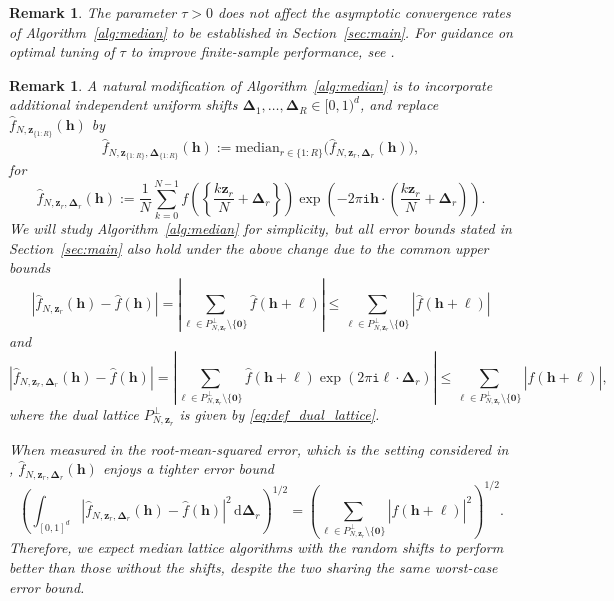 \documentclass[a4paper,11pt]{article}
\newtheorem{remark}[theorem]{Remark}
\newcommand{\rd}{\, \mathrm{d}}
\newcommand{\bszero}{\boldsymbol{0}}
\newcommand{\bsh}{\boldsymbol{h}}
\newcommand{\bsl}{\boldsymbol{\ell}}
\newcommand{\bsz}{\boldsymbol{z}}
\newcommand{\bsDelta}{\boldsymbol{\Delta}}
\newcommand{\icomp}{\mathtt{i}}
\newcommand{\abs}[1]{\left\vert#1\right\vert}
\begin{document}
\begin{remark}
    The parameter $\tau>0$ does not affect the asymptotic convergence rates of Algorithm~\ref{alg:median} to be established in Section~\ref{sec:main}. For guidance on optimal tuning of $\tau$ to improve finite-sample performance, see \cite[Remark 16]{PKG25}.
\end{remark}

\begin{remark}
A natural modification of Algorithm~\ref{alg:median} is to incorporate additional independent uniform shifts $\bsDelta_1,\dots,\bsDelta_R \in [0,1)^d$, and replace $\widehat{f}_{N,\bsz_{\{1{:}R\}}}(\bsh)$ by 
       \[ 
            \widehat{f}_{N,\bsz_{\{1{:}R\}},\bsDelta_{\{1{:}R\}}}(\bsh):=\mathrm{median}_{r\in\{1{:}R\}} \Big(\widehat{f}_{N,\bsz_r,\bsDelta_r}(\bsh)\Big),
       \]
       for 
                   \[ 
            \widehat{f}_{N,\bsz_r,\bsDelta_r}(\bsh):=
            \frac{1}{N} \sum_{k=0}^{N-1} f\left( \left\{ \frac{k \bsz_r}{N}+\bsDelta_r \right\}\right)\exp\left(-2\pi \icomp \bsh \cdot \left( \frac{k \bsz_r}{N}+\bsDelta_r\right)\right).
            \]  
            We will study Algorithm~\ref{alg:median} for simplicity, but all error bounds stated in Section~\ref{sec:main} also hold under the above change due to the common upper bounds
            $$\abs{\widehat{f}_{N,\bsz_r}(\bsh)-\widehat{f}({\bsh})}=\abs{\sum_{\bsl\in P^\perp_{N,\bsz_r}\setminus\{\bszero\} }\widehat{f}({\bsh+\bsl})}\leq \sum_{\bsl\in P^\perp_{N,\bsz_r}\setminus\{\bszero\} }\abs{\widehat{f}({\bsh+\bsl})} $$
            and 
            $$\abs{\widehat{f}_{N,\bsz_r,\bsDelta_r}(\bsh)-\widehat{f}({\bsh})}=\abs{\sum_{\bsl\in P^\perp_{N,\bsz_r}\setminus\{\bszero\} }\widehat{f}({\bsh+\bsl})\exp(2\pi\icomp \bsl\cdot\bsDelta_r)}\leq \sum_{\bsl\in P^\perp_{N,\bsz_r}\setminus\{\bszero\} }\abs{\widehat{f}({\bsh+\bsl})},$$
         where the dual lattice $P^\perp_{N,\bsz_r}$ is given by \eqref{eq:def_dual_lattice}.
            
    When measured in the root-mean-squared error, which is the setting considered in \cite{PKG25}, $\widehat{f}_{N,\bsz_r,\bsDelta_r}(\bsh)$ enjoys a tighter error bound
    \begin{equation*}
      \left(\int_{[0,1]^d} |\widehat{f}_{N,\bsz_r,\bsDelta_r}(\bsh)-\widehat{f}(\bsh)|^2 \rd\bsDelta_r\right)^{1/2}= \left(\sum_{\bsl \in P_{N,\boldsymbol{z}_r}^\perp\setminus \{\bszero\}}|\widehat{f}(\bsh+\bsl)|^2\right)^{1/2}.
    \end{equation*}
    Therefore, we expect median lattice algorithms with the random shifts to perform better than those without the shifts, despite the two sharing the same worst-case error bound.
\end{remark}
\end{document}
